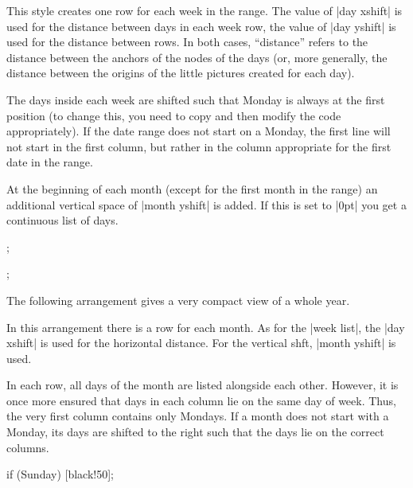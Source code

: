 \begin{itemize}
  This style creates one row for each week in the range. The value
  of |day xshift| is used for the distance between days in each week
  row, the value of |day yshift| is used for the distance between
  rows. In both cases, ``distance''  refers to the distance between
  the anchors of the nodes of the days (or, more generally, the
  distance between the origins of the little pictures created for each
  day).

  The days inside each week are shifted such that Monday is always
  at the first position (to change this, you need to copy and then
  modify the code appropriately). If the date range does not start on
  a Monday, the first line will not start in the first column, but
  rather in the column appropriate for the first date in the range.

  At the beginning of each month (except for the first month in the
  range) an additional vertical space of |month yshift| is added. If
  this is set to |0pt| you get a continuous list of days.
\begin{codeexample}[]
\tikz
  \calendar [dates=2000-01-01 to 2000-02-last,week list];
\end{codeexample}
\begin{codeexample}[]
\tikz
  \calendar [dates=2000-01-01 to 2000-02-last,week list,
             month yshift=0pt];
\end{codeexample}
\end{itemize}

The following arrangement gives a very compact view of a whole year.
\begin{itemize}
  In this arrangement there is a row for each month. As for the
  |week list|, the |day xshift| is used for the horizontal distance.
  For the vertical shft, |month yshift| is used.

  In each row, all days of the month are listed alongside each
  other. However, it is once more ensured that days in each column lie
  on the same day of week. Thus, the very first column contains only
  Mondays. If a month does not start with a Monday, its days are
  shifted to the right such that the days lie on the correct columns. 
\end{itemize}
\begin{codeexample}[]
\sffamily\scriptsize    
\tikz
  \calendar [dates=2000-01-01 to 2000-12-31,
             month list,month label left,month yshift=1.25em]
            if (Sunday) [black!50];
\end{codeexample}


